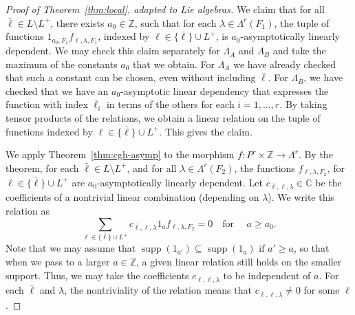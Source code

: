 \documentclass[12pt]{amsart}
\newcommand{\op}[1]{\operatorname{#1}}
\newcommand{\ring}[1]{{\mathbb #1}}
\def\Y{\Upsilon}
\newcommand{\fh}{\mathfrak{h}}
\theoremstyle{plain}
\theoremstyle{definition}
\begin{document}
\begin{proof}[Proof of Theorem~\ref{thm:local}, adapted to Lie algebras]
We claim that for all ${\bar\ell} \in L\setminus L^+$, there exists
$a_0\in\ring{Z}$, such that for each $\lambda\in \Lambda^r(F_1)$, the
tuple of functions $1_{a_0,F_1}f_{\ell,\lambda,F_1}$, indexed by
$\ell\in \{{\bar\ell}\}\cup L^+$, is $a_0$-asymptotically linearly
dependent.  We may check this claim separately for $\Lambda_A$ and
$\Lambda_B$ and take the maximum of the constants $a_0$ that we
obtain.  For $\Lambda_A$ we have already checked that such a constant
can be chosen, even without including $\bar\ell$.  For $\Lambda_B$, we
have checked that we have an $a_0$-asymptotic linear dependency that
expresses the function with index $\bar\ell_i$ in terms of the others
for each $i=1,\ldots,r$. By taking tensor products of the relations,
we obtain a linear relation on the tuple of functions indexed by $\ell\in
\{{\bar\ell}\}\cup L^+$.  This gives the claim.


We apply Theorem~\ref{thm:cgh-asymp} to the morphism
$f:P^r\times\ring{Z}\to \Lambda^r$.  By the theorem, for each ${\bar\ell}\in
L\setminus L^+$, and for all $\lambda\in \Lambda^r({F_2})$, the
functions $f_{\ell,\lambda,F_2}$, for $\ell\in \{{\bar\ell}\}\cup L^+$ are
$a_0$-asymptotically linearly dependent.  Let $c_{{\bar\ell},\ell,\lambda}\in
\ring{C}$ be the coefficients of a nontrivial linear combination
(depending on $\lambda$).  We write this relation as
\begin{equation}\label{eqn:du}
\sum_{\ell\in \{{\bar\ell}\}\cup L^+} c_{{\bar\ell},\ell,\lambda}1_af_{\ell,\lambda,F_2}  =
0\quad\text{for }\quad a\ge a_0.
\end{equation}
Note that we may assume that
$\op{supp}(1_{a'})\subseteq\op{supp}(1_a)$ if $a'\ge a$, so that when
we pass to a larger $a\in\ring{Z}$, a given linear relation still
holds on the smaller support. Thus, we may take the coefficients
$c_{{\bar\ell},\ell,\lambda}$ to be independent of $a$.  For each
${\bar\ell}$ and $\lambda$, the nontriviality of the relation means
that $c_{{\bar\ell},\ell,\lambda}\ne 0$ for some $\ell$.


\end{proof}
\end{document}
